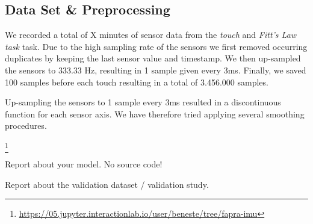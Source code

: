 \subsection{Data Set \& Preprocessing}
\label{sec:prepro}
We recorded a total of X minutes of sensor data from the \textit{touch} and \textit{Fitt's Law task} task. 
Due to the high sampling rate of the sensors we first removed occurring duplicates by keeping the last sensor value and timestamp.
We then up-sampled the sensors to 333.33 Hz, resulting in 1 sample given every 3ms. 
Finally, we saved 100 samples before each touch resulting in a total of 3.456.000 samples.

Up-sampling the sensors to 1 sample every 3ms resulted in a discontinuous function for each sensor axis. 
We have therefore tried applying several smoothing procedures.


\footnote{\url{https://05.jupyter.interactionlab.io/user/beneste/tree/fapra-imu}}


Report about your model. No source code!

Report about the validation dataset / validation study. 